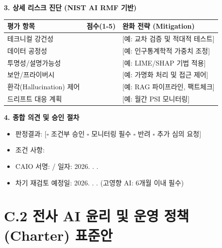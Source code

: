 \begin{tcolorbox}[colback=white, colframe=blue, title={[Template C.1] AI 영향 평가 결과 보고서}]
\textbf{3. 상세 리스크 진단 (NIST AI RMF 기반)}
\begin{center}
\begin{tabular}{|l|c|l|}
\hline
\textbf{평가 항목} & \textbf{점수(1-5)} & \textbf{완화 전략 (Mitigation)} \\ \hline
테크니컬 강건성 & \hspace{0.5cm} & [예: 교차 검증 및 적대적 테스트] \\ \hline
데이터 공정성 & \hspace{0.5cm} & [예: 인구통계학적 가중치 조정] \\ \hline
투명성/설명가능성 & \hspace{0.5cm} & [예: LIME/SHAP 기법 적용] \\ \hline
보안/프라이버시 & \hspace{0.5cm} & [예: 가명화 처리 및 접근 제어] \\ \hline
환각(Hallucination) 제어 & \hspace{0.5cm} & [예: RAG 파이프라인, 팩트체크] \\ \hline
드리프트 대응 계획 & \hspace{0.5cm} & [예: 월간 PSI 모니터링] \\ \hline
\end{tabular}
\end{center}

\textbf{4. 종합 의견 및 승인 절차}
\begin{itemize}
    \item 판정결과: [$\square$ 조건부 승인 $\square$ 모니터링 필수 $\square$ 반려 $\square$ 추가 심의 요청]
    \item 조건 사항: \underline{\hspace{7cm}}
    \item CAIO 서명: \underline{\hspace{3cm}} / 일자: 2026. \hspace{0.5cm} . \hspace{0.5cm} .
    \item 차기 재검토 예정일: 2026. \hspace{0.5cm} . \hspace{0.5cm} . \quad (고영향 AI: 6개월 이내 필수)
\end{itemize}
\end{tcolorbox}

\section*{C.2 전사 AI 윤리 및 운영 정책(Charter) 표준안}

